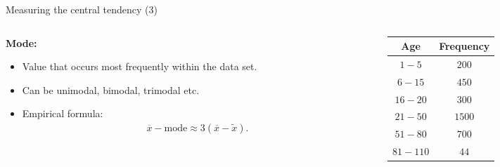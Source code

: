 \documentclass[aspectratio=169,t]{beamer}
\begin{document}
  { 
    \begin{frame}{Measuring the central tendency (3)}
      \begin{columns}
        \begin{column}{0.6\textwidth}
          \textbf{Mode:}
          \begin{itemize}[noitemsep]
            \item Value that occurs most frequently within the data set.
            \item Can be unimodal, bimodal, trimodal etc.
            \item Empirical formula:
            \begin{align}
              \overline{x} - \text{mode} \approx 3(\overline{x}- \tilde{x}).
            \end{align}
          \end{itemize}
        \end{column}
        \begin{column}{0.3\textwidth}  %
        \begin{table}
        \begin{tabular}{|c|c|}
          Age & Frequency \\ \hline
          $1-5$ & $200$ \\
          $6-15$ & $450$ \\
          $16-20$ & $300$ \\
          $21-50$ & $1500$ \\
          $51-80$ & $700$ \\
          $81-110$ & $44$
        \end{tabular}\\[0.5cm]
        \end{table}
        \end{column}
      \end{columns}
    \end{frame}
  }
\end{document}
